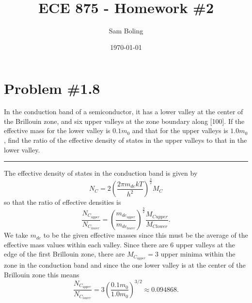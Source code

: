 \documentclass{article}
\title{ECE 875 - Homework \#2}
\author{Sam Boling}
\date{\today}
\newcommand{\horline}
           {\begin{center}
              \noindent\rule{8cm}{0.4pt}
            \end{center}}
\begin{document}
\maketitle

\section*{Problem \#1.8}
In the conduction band of a semiconductor, it has a lower valley at the center
of the Brillouin zone, and six upper valleys at the zone boundary along [100].
If the effective mass for the lower valley is $0.1m_0$ and that for the upper
valleys is $1.0m_0$, find the ratio of the effective density of states in the
upper valleys to that in the lower valley.
\horline
The effective density of states in the conduction band is given by
$$
N_{C} = 2 \left(\frac{2 \pi m_{de} kT}{h^2}\right)^{\frac{3}{2}} M_C
$$
so that the ratio of effective densities is
$$
\frac{N_{C_{upper}}}{N_{C_{lower}}} 
  = \left(\frac{m_{de_{upper}}}{m_{de_{lower}}}\right)^{\frac{3}{2}}
    \frac{M_{C{upper}}}{M_{C{lower}}}.
$$
We take $m_{de}$ to be the given effective masses since this must be the
average of the effective mass values within each valley.
Since there are 6 upper valleys at the edge of the first Brillouin zone,
there are $M_{C_{upper}} = 3$ upper minima within the zone in the conduction 
band and since the one lower valley is at the center of the Brillouin zone 
this means
$$
\frac{N_{C_{upper}}}{N_{C_{lower}}} = 
  3\left(\frac{0.1 m_0}{1.0 m_0}\right)^{3/2} 
 \approx 0.094868.
$$
\end{document}
